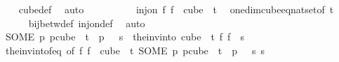\begin{isabellebody}
\ {\isacharasterisk}{\kern0pt}\ \isamarkupfalse%
\ cube{\isacharunderscore}{\kern0pt}def\ \isamarkupfalse%
\ auto\ \ \isanewline
\ \ \isacommand{{\isacharbraceright}{\kern0pt}}\isamarkupfalse%
\isanewline
\ \ \isamarkupfalse%
\ \isamarkupfalse%
\ {\isachardoublequoteopen}inj{\isacharunderscore}{\kern0pt}on\ {\isacharparenleft}{\kern0pt}{\isasymlambda}f{\isachardot}{\kern0pt}\ f\ {}{\isacharparenright}{\kern0pt}\ {\isacharparenleft}{\kern0pt}cube\ {}\ t{\isacharparenright}{\kern0pt}{\isachardoublequoteclose}\ \isamarkupfalse%
\ one{\isacharunderscore}{\kern0pt}dim{\isacharunderscore}{\kern0pt}cube{\isacharunderscore}{\kern0pt}eq{\isacharunderscore}{\kern0pt}nat{\isacharunderscore}{\kern0pt}set{\isacharbrackleft}{\kern0pt}of\ t{\isacharbrackright}{\kern0pt}\ \isanewline
\ \ \ \ \isamarkupfalse%
\ bij{\isacharunderscore}{\kern0pt}betw{\isacharunderscore}{\kern0pt}def\ inj{\isacharunderscore}{\kern0pt}on{\isacharunderscore}{\kern0pt}def\ \isamarkupfalse%
\ auto\ \isanewline
\ \ \isamarkupfalse%
\ \isamarkupfalse%
\ {\isachardoublequoteopen}{\isacharparenleft}{\kern0pt}SOME\ p{\isachardot}{\kern0pt}\ p{\isasymin}cube\ {}\ {\isacharparenleft}{\kern0pt}t{\isacharplus}{\kern0pt}{}{\isacharparenright}{\kern0pt}\ {\isasymand}\ p\ {}\ {\isacharequal}{\kern0pt}\ s{\isacharparenright}{\kern0pt}\ {\isacharequal}{\kern0pt}\ {\isacharparenleft}{\kern0pt}the{\isacharunderscore}{\kern0pt}inv{\isacharunderscore}{\kern0pt}into\ {\isacharparenleft}{\kern0pt}cube\ {}\ t{\isacharparenright}{\kern0pt}\ {\isacharparenleft}{\kern0pt}{\isasymlambda}f{\isachardot}{\kern0pt}\ f\ {}{\isacharparenright}{\kern0pt}\ s{\isacharparenright}{\kern0pt}{\isachardoublequoteclose}\ \isanewline
\ \ \ \ \isamarkupfalse%
\ the{\isacharunderscore}{\kern0pt}inv{\isacharunderscore}{\kern0pt}into{\isacharunderscore}{\kern0pt}f{\isacharunderscore}{\kern0pt}eq\ {\isacharbrackleft}{\kern0pt}of\ {\isachardoublequoteopen}{\isasymlambda}f{\isachardot}{\kern0pt}\ f\ {}{\isachardoublequoteclose}\ {\isachardoublequoteopen}cube\ {}\ t{\isachardoublequoteclose}\ {\isachardoublequoteopen}{\isacharparenleft}{\kern0pt}SOME\ p{\isachardot}{\kern0pt}\ p{\isasymin}cube\ {}\ {\isacharparenleft}{\kern0pt}t{\isacharplus}{\kern0pt}{}{\isacharparenright}{\kern0pt}\ {\isasymand}\ p\ {}\ {\isacharequal}{\kern0pt}\ s{\isacharparenright}{\kern0pt}{\isachardoublequoteclose}\ s{\isacharbrackright}{\kern0pt}\ \isamarkupfalse%

\end{isabellebody}
